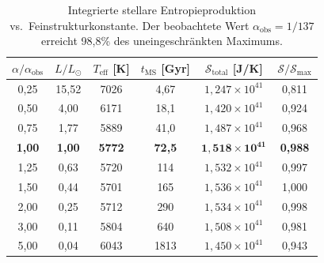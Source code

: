 \documentclass[12pt,a4paper]{article}
\theoremstyle{remark}
\begin{document}
\begin{table}[ht]
\centering
\caption{Integrierte stellare Entropieproduktion vs.\ Feinstrukturkonstante. Der beobachtete Wert $\alpha_{\text{obs}} = 1/137$ erreicht 98,8\% des uneingeschr\"ankten Maximums.}
\label{tab:alpha_scan}
\begin{tabular}{cccccc}
\toprule
$\alpha / \alpha_{\text{obs}}$ & $L / L_\odot$ & $T_{\text{eff}}$ [K] & $t_{\text{MS}}$ [Gyr] & $\mathcal{S}_{\text{total}}$ [J/K] & $\mathcal{S} / \mathcal{S}_{\text{max}}$ \\
\midrule
0{,}25 & 15{,}52 & 7026 & 4{,}67 & $1{,}247 \times 10^{41}$ & 0{,}811 \\
0{,}50 & 4{,}00 & 6171 & 18{,}1 & $1{,}420 \times 10^{41}$ & 0{,}924 \\
0{,}75 & 1{,}77 & 5889 & 41{,}0 & $1{,}487 \times 10^{41}$ & 0{,}968 \\
\textbf{1{,}00} & \textbf{1{,}00} & \textbf{5772} & \textbf{72{,}5} & $\mathbf{1{,}518 \times 10^{41}}$ & \textbf{0{,}988} \\
1{,}25 & 0{,}63 & 5720 & 114 & $1{,}532 \times 10^{41}$ & 0{,}997 \\
1{,}50 & 0{,}44 & 5701 & 165 & $1{,}536 \times 10^{41}$ & 1{,}000 \\
2{,}00 & 0{,}25 & 5712 & 290 & $1{,}534 \times 10^{41}$ & 0{,}998 \\
3{,}00 & 0{,}11 & 5804 & 640 & $1{,}508 \times 10^{41}$ & 0{,}981 \\
5{,}00 & 0{,}04 & 6043 & 1813 & $1{,}450 \times 10^{41}$ & 0{,}943 \\
\bottomrule
\end{tabular}
\end{table}
\end{document}
